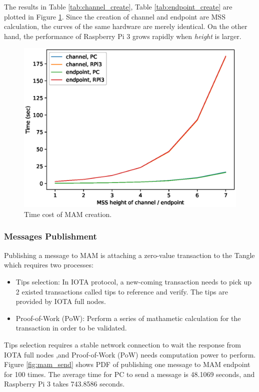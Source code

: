 \documentclass[journal,article,applsci,submit,moreauthors,pdftex]{Definitions/mdpi}
\begin{document}
The results in Table \ref{tab:channel_create}, Table \ref{tab:endpoint_create} are plotted in Figure \ref{fig:mam_create}. Since the creation of channel and endpoint are MSS calculation, the curves of the same hardware are merely identical. On the other hand, the performance of Raspberry Pi 3 grows rapidly when \textit{height} is larger.
  
\begin{figure}[H]
    \centering
    \includegraphics[width=3.3 in]{mam_create}
    \caption{Time cost of MAM creation.}
    \label{fig:mam_create}
\end{figure}

\subsubsection{Messages Publishment}
Publishing a message to MAM is attaching a zero-value transaction to the Tangle which requires two processes:
\begin{itemize}[leftmargin=*,labelsep=5.8mm]
	\item	Tips selection: In IOTA protocol, a new-coming transaction needs to pick up 2 existed transactions called tips to reference and verify. The tips are provided by IOTA full nodes.
	\item	Proof-of-Work (PoW): Perform a series of mathametic calculation for the transaction in order to be validated.
\end{itemize}

Tips selection requires a stable network connection to wait the response from IOTA full nodes ,and Proof-of-Work (PoW) needs computation power to perform. Figure \ref{fig:mam_send} shows PDF of publishing one message to MAM endpoint for 100 times. The average time for PC to send a message is 48.1069 seconds, and Raspberry Pi 3 takes 743.8586 seconds.
\end{document}
